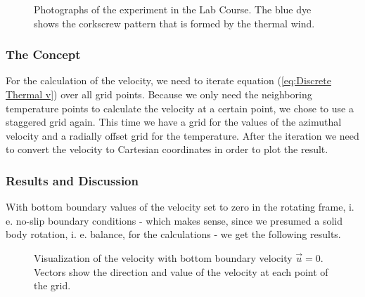 \documentclass[12pt, a4paper]{article} %
\begin{document}
		\begin{figure}
				\centering
				\captionsetup{width=0.9\textwidth}
			\caption[Photographs of Thermal Wind Experiment]{Photographs of the experiment in the Lab Course. The blue dye shows the corkscrew pattern that is formed by the thermal wind.}
		\end{figure}
		
		
		\subsubsection{The Concept}  %
			For the calculation of the velocity, we need to iterate equation (\ref{eq:Discrete Thermal v}) over all grid points. Because we only need the neighboring temperature points to calculate the velocity at a certain point, we chose to use a staggered grid again. This time we have a grid for the values of the azimuthal velocity and a radially offset grid for the temperature. After the iteration we need to convert the velocity to Cartesian coordinates in order to plot the result.
			
		\subsubsection{Results and Discussion}
			With bottom boundary values of the velocity set to zero in the rotating frame, i. e. no-slip boundary conditions - which makes sense, since we presumed a solid body rotation, i. e. balance, for the calculations - we get the following results.
			
			\begin{figure}[h]
				\centering
				\captionsetup{width=0.9\textwidth}
					\qquad
				\caption[Visualization of the velocity with bottom boundary velocity $\vec{u}=0$]{Visualization of the velocity with bottom boundary velocity $\vec{u}=0$. Vectors show the direction and value of the velocity at each point of the grid.}
			\end{figure}
			
\end{document}
